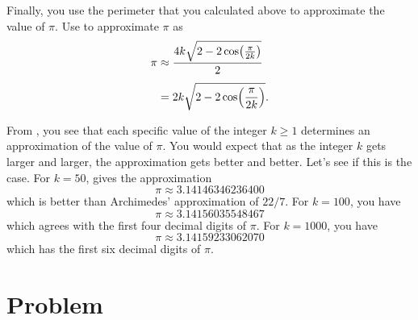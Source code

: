 \documentclass[a4paper,oneside,12pt]{article}
\begin{document}
Finally, you use the perimeter that you calculated above to
approximate the value of $\pi$.  Use
 to approximate $\pi$ as
\begin{equation}
\label{eqn:formula_approximate_pi}
\begin{aligned}
\pi
&\approx
\frac{
  4k\sqrt{
    2
    -
    2\cos\parenthesis*{\frac{\pi}{2k}}
  }
}{
  2
} \\[4pt]
&=
2k\sqrt{
  2
  -
  2\cos\parenthesis*{\frac{\pi}{2k}}
}.
\end{aligned}
\end{equation}

From , you see that each specific
value of the integer $k \geq 1$ determines an approximation of the
value of $\pi$.  You would expect that as the integer $k$ gets larger
and larger, the approximation gets better and better.  Let's see if
this is the case.  For $k = 50$, 
gives the approximation
\[
\pi
\approx
3.14146346236400
\]
which is better than Archimedes' approximation of $22 / 7$.  For
$k = 100$, you have
\[
\pi
\approx
3.14156035548467
\]
which agrees with the first four decimal digits of $\pi$.  For
$k = 1000$, you have
\[
\pi
\approx
3.14159233062070
\]
which has the first six decimal digits of $\pi$.



\section*{Problem}
\end{document}
